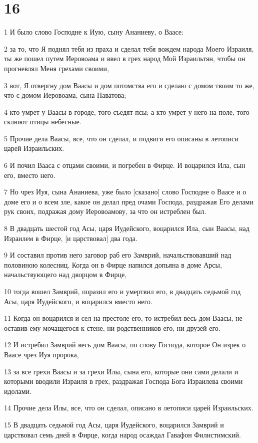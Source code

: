 \chapter{16}

\par 1 И было слово Господне к Иую, сыну Ананиеву, о Ваасе:
\par 2 за то, что Я поднял тебя из праха и сделал тебя вождем народа Моего Израиля, ты же пошел путем Иеровоама и ввел в грех народ Мой Израильтян, чтобы он прогневлял Меня грехами своими,
\par 3 вот, Я отвергну дом Ваасы и дом потомства его и сделаю с домом твоим то же, что с домом Иеровоама, сына Наватова;
\par 4 кто умрет у Ваасы в городе, того съедят псы; а кто умрет у него на поле, того склюют птицы небесные.
\par 5 Прочие дела Ваасы, все, что он сделал, и подвиги его описаны в летописи царей Израильских.
\par 6 И почил Вааса с отцами своими, и погребен в Фирце. И воцарился Ила, сын его, вместо него.
\par 7 Но чрез Иуя, сына Ананиева, уже было [сказано] слово Господне о Ваасе и о доме его и о всем зле, какое он делал пред очами Господа, раздражая Его делами рук своих, подражая дому Иеровоамову, за что он истреблен был.
\par 8 В двадцать шестой год Асы, царя Иудейского, воцарился Ила, сын Ваасы, над Израилем в Фирце, [и царствовал] два года.
\par 9 И составил против него заговор раб его Замврий, начальствовавший над половиною колесниц. Когда он в Фирце напился допьяна в доме Арсы, начальствующего над дворцом в Фирце,
\par 10 тогда вошел Замврий, поразил его и умертвил его, в двадцать седьмой год Асы, царя Иудейского, и воцарился вместо него.
\par 11 Когда он воцарился и сел на престоле его, то истребил весь дом Ваасы, не оставив ему мочащегося к стене, ни родственников его, ни друзей его.
\par 12 И истребил Замврий весь дом Ваасы, по слову Господа, которое Он изрек о Ваасе чрез Иуя пророка,
\par 13 за все грехи Ваасы и за грехи Илы, сына его, которые они сами делали и которыми вводили Израиля в грех, раздражая Господа Бога Израилева своими идолами.
\par 14 Прочие дела Илы, все, что он сделал, описано в летописи царей Израильских.
\par 15 В двадцать седьмой год Асы, царя Иудейского, воцарился Замврий и царствовал семь дней в Фирце, когда народ осаждал Гавафон Филистимский.
